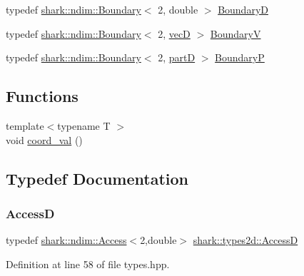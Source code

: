 \begin{DoxyCompactItemize}
\item 
typedef \hyperlink{classshark_1_1ndim_1_1_boundary}{shark\+::ndim\+::\+Boundary}$<$ 2, double $>$ \hyperlink{namespaceshark_1_1types2d_a98e10b5b5ecbc2e222cc5c275c55940b}{BoundaryD}
\item 
typedef \hyperlink{classshark_1_1ndim_1_1_boundary}{shark\+::ndim\+::\+Boundary}$<$ 2, \hyperlink{namespaceshark_1_1types2d_a738ed8ca791a1fce6898c99ca68afc45}{vecD} $>$ \hyperlink{namespaceshark_1_1types2d_a87cb1ad681aa7cf9f43c530c28f80ba4}{BoundaryV}
\item 
typedef \hyperlink{classshark_1_1ndim_1_1_boundary}{shark\+::ndim\+::\+Boundary}$<$ 2, \hyperlink{namespaceshark_1_1types2d_a87ef5d69759f5e1abf90fa90d89ff15c}{partD} $>$ \hyperlink{namespaceshark_1_1types2d_acfe057fc2cca7dd337422740693dc90a}{BoundaryP}
\end{DoxyCompactItemize}
\subsection*{Functions}
\begin{DoxyCompactItemize}
\item 
{\footnotesize template$<$typename T $>$ }\\void \hyperlink{namespaceshark_1_1types2d_a2a01f3d69a9f4708ea61caf9dd6cb709}{coord\+\_\+val} ()
\end{DoxyCompactItemize}


\subsection{Typedef Documentation}
\hypertarget{namespaceshark_1_1types2d_a2033830d411d0561a2a0b401fe02c742}{}\label{namespaceshark_1_1types2d_a2033830d411d0561a2a0b401fe02c742} 
\subsubsection{\texorpdfstring{AccessD}{AccessD}}
{\footnotesize\ttfamily typedef \hyperlink{classshark_1_1ndim_1_1_access}{shark\+::ndim\+::\+Access}$<$2,double$>$ \hyperlink{namespaceshark_1_1types2d_a2033830d411d0561a2a0b401fe02c742}{shark\+::types2d\+::\+AccessD}}



Definition at line 58 of file types.\+hpp.

\hypertarget{namespaceshark_1_1types2d_a6fb40d33e103ffc80e690a4113ead47e}{}\label{namespaceshark_1_1types2d_a6fb40d33e103ffc80e690a4113ead47e} 
